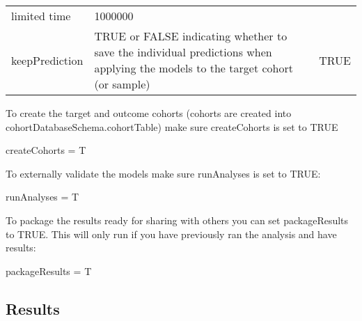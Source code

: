 \documentclass[
]{article}
\newenvironment{Shaded}{\begin{snugshade}}{\end{snugshade}}
\newcommand{\NormalTok}[1]{#1}
\newcommand{\StringTok}[1]{\textcolor[rgb]{0.31,0.60,0.02}{#1}}
\begin{document}
\begin{longtable}[]{@{}lll@{}}
\begin{minipage}[t]{0.46\columnwidth}
limited time\strut
\end{minipage} & \begin{minipage}[t]{0.24\columnwidth}\raggedright
1000000\strut
\end{minipage}\tabularnewline
\begin{minipage}[t]{0.21\columnwidth}\raggedright
keepPrediction\strut
\end{minipage} & \begin{minipage}[t]{0.46\columnwidth}\raggedright
TRUE or FALSE indicating whether to save the individual predictions when
applying the models to the target cohort (or sample)\strut
\end{minipage} & \begin{minipage}[t]{0.24\columnwidth}\raggedright
TRUE\strut
\end{minipage}\tabularnewline
\bottomrule
\end{longtable}

To create the target and outcome cohorts (cohorts are created into
cohortDatabaseSchema.cohortTable) make sure createCohorts is set to TRUE

\begin{Shaded}
\begin{Highlighting}[]
\NormalTok{    createCohorts =}\StringTok{ }\NormalTok{T}
\end{Highlighting}
\end{Shaded}

To externally validate the models make sure runAnalyses is set to TRUE:

\begin{Shaded}
\begin{Highlighting}[]
\NormalTok{    runAnalyses =}\StringTok{ }\NormalTok{T}
\end{Highlighting}
\end{Shaded}

To package the results ready for sharing with others you can set
packageResults to TRUE. This will only run if you have previously ran
the analysis and have results:

\begin{Shaded}
\begin{Highlighting}[]
\NormalTok{    packageResults =}\StringTok{ }\NormalTok{T}
\end{Highlighting}
\end{Shaded}

\hypertarget{results}{%
\subsection{Results}\label{results}}
\end{document}

